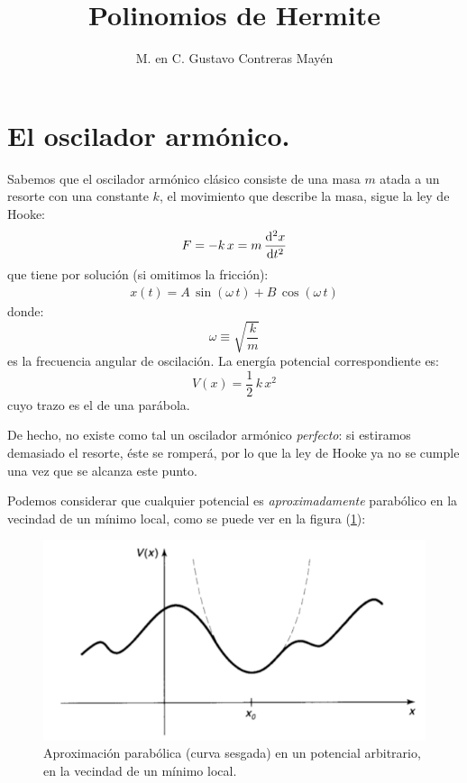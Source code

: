 \documentclass[12pt]{article}
\title{\large{Polinomios de Hermite}}
\author{M. en C. Gustavo Contreras Mayén}
\date{}
\numberwithin{equation}{section}
\begin{document}
\maketitle
\fontsize{14}{14}\selectfont
{}
\tableofcontents
\newpage


\section{El oscilador armónico.}

Sabemos que el oscilador armónico clásico consiste de una masa $m$ atada a un resorte con una constante $k$, el movimiento que describe la masa, sigue la ley de Hooke:
\begin{align*}
F = - k \, x = m \, \dv[2]{x}{t}
\end{align*}
que tiene por solución (si omitimos la fricción):
\begin{align*}
x(t) = A \, \sin (\omega \, t) + B \, \cos (\omega \, t)
\end{align*}
donde:
\begin{equation}
\omega \equiv \sqrt{\dfrac{k}{m}}
\label{eq:ecuacion_02_041}
\end{equation}
es la frecuencia angular de oscilación. La energía potencial correspondiente es:
\begin{equation}
V(x) = \dfrac{1}{2} \, k \, x^{2}
\label{eq:ecuacion_02_042}
\end{equation}
cuyo trazo es el de una parábola.
\par
De hecho, no existe como tal un oscilador armónico \emph{perfecto}: si estiramos demasiado el resorte, éste se romperá, por lo que la ley de Hooke ya no se cumple una vez que se alcanza este punto.
\par
Podemos considerar que cualquier potencial es \textit{aproximadamente} parabólico en la vecindad de un mínimo local, como se puede ver en la figura (\ref{fig:figura_02_04}):
\begin{figure}[H]
    \centering
    \includegraphics[scale=0.5]{Imagenes/Potencial_arbitrario.png}
    \caption{Aproximación parabólica (curva sesgada) en un potencial arbitrario, en la vecindad de un mínimo local.}
    \label{fig:figura_02_04}
\end{figure}
\end{document}
